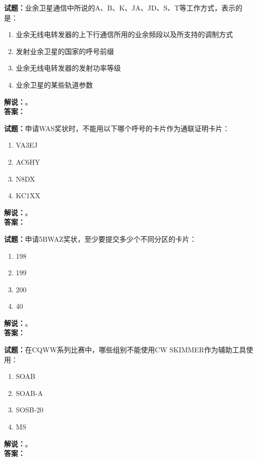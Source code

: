 \documentclass{ctexbook}
\begin{document}
\bigskip




\noindent\textbf{试题：}业余卫星通信中所说的A、B、K、JA、JD、S、T等工作方式，表示的是：
\begin{enumerate}[leftmargin=3em]
\item 业余无线电转发器的上下行通信所用的业余频段以及所支持的调制方式
\item 发射业余卫星的国家的呼号前缀
\item 业余无线电转发器的发射功率等级
\item 业余卫星的某些轨道参数
\end{enumerate}
\noindent\textbf{解说：}\textbf{}。\\\noindent\textbf{答案：}

\bigskip




\noindent\textbf{试题：}申请WAS奖状时，不能用以下哪个呼号的卡片作为通联证明卡片：
\begin{enumerate}[leftmargin=3em]
\item VA3EJ
\item AC6HY
\item N8DX
\item KC1XX
\end{enumerate}
\noindent\textbf{解说：}\textbf{}。\\\noindent\textbf{答案：}

\bigskip




\noindent\textbf{试题：}申请5BWAZ奖状，至少要提交多少个不同分区的卡片：
\begin{enumerate}[leftmargin=3em]
\item 198
\item 199
\item 200
\item 40
\end{enumerate}
\noindent\textbf{解说：}\textbf{}。\\\noindent\textbf{答案：}

\bigskip




\noindent\textbf{试题：}在CQWW系列比赛中，哪些组别不能使用CW SKIMMER作为辅助工具使用：
\begin{enumerate}[leftmargin=3em]
\item SOAB
\item SOAB-A
\item SOSB-20
\item MS
\end{enumerate}
\noindent\textbf{解说：}\textbf{}。\\\noindent\textbf{答案：}
\end{document}
